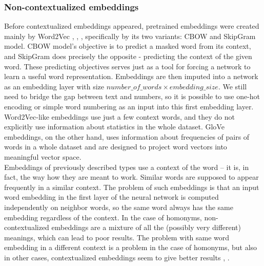 \subsubsection{Non-contextualized embeddings}
Before contextualized embeddings appeared, pretrained embeddings were created mainly by Word2Vec \citep{Mikolov2013}, \citep{Turian2010}, \citep{Pennington}, specifically by its two variants: CBOW and SkipGram model.
CBOW model's objective is to predict a masked word from its context, and SkipGram does precisely the opposite - predicting the context of the given word. These predicting objectives serves just as a tool for forcing a network to learn a useful word representation. Embeddings are then imputed into a network as an embedding layer with size $number\_of\_words \times embedding\_size$. We still need to bridge the gap between text and numbers, so it is possible to use one-hot encoding or simple word numbering as an input into this first embedding layer.  Word2Vec-like embeddings use just a few context words, and they do not explicitly use information about statistics in the whole dataset. GloVe \citep{Pennington} embeddings, on the other hand, uses information about frequencies of pairs of words in a whole dataset and are designed to project word vectors into meaningful vector space. 
\\
Embeddings of previously described types use a  context of the word -- it is, in fact, the way how they are meant to work. Similar words are supposed to appear frequently in a similar context. The problem of such embeddings is that an input word embedding in the first layer of the neural network is computed independently on neighbor words, so the same word always has the same embedding regardless of the context. In the case of homonyms, non-contextualized embeddings are a mixture of all the (possibly very different) meanings, which can lead to poor results. %
The problem with same word embedding in a different context is a problem in the case of homonyms, but also in other cases, contextualized embeddings seem to give better results \citep{Straka2019a}, \citep{Liu2020}.

